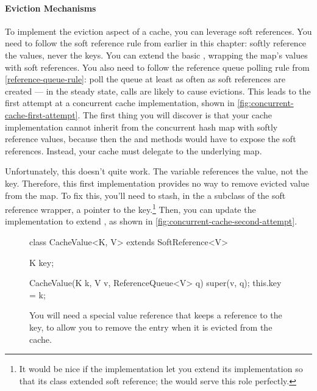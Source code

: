 \paragraph{Eviction Mechanisms}
To implement the eviction aspect of a cache, you can leverage soft references.
You need to follow the soft reference rule from earlier in this chapter: softly
reference the values, never the keys. You can extend the basic
, wrapping the map's values with soft references. You
also need to follow the reference queue polling rule from
\autoref{reference-queue-rule}: poll the queue at least as often as soft
references are created --- in the steady state,  calls are likely to
cause evictions. This leads to the first attempt at a concurrent cache
implementation, shown in \autoref{fig:concurrent-cache-first-attempt}. The first
thing you will discover is that your cache implementation cannot inherit from
the concurrent hash map with softly reference values, because then the
 and  methods would have to expose the soft references.
Instead, your cache must delegate to the underlying map. 

Unfortunately, this doesn't quite work. The variable  references the
value, not the key. Therefore, this first implementation provides no way to
remove evicted value from the map. To fix this, you'll need to stash, in the a
subclass of the soft reference wrapper, a pointer to the key.\footnote{It would
be nice if the  implementation let you extend its
implementation so that its  class extended soft reference; the
 would serve this role perfectly.} Then, you can update the
 implementation to extend
, as shown in
\autoref{fig:concurrent-cache-second-attempt}.


\begin{wrapfigure}{r}{0.43\textwidth}
\centering
\begin{framedlisting}
class CacheValue<K, V> extends SoftReference<V> {
  K key;

  CacheValue(K k, V v, ReferenceQueue<V> q) {
    super(v, q);
    this.key = k;
  }
}
\end{framedlisting}
\caption{You will need a special value reference that keeps a reference to the
key, to allow you to remove the entry when it is evicted from the cache.}
\end{wrapfigure}


